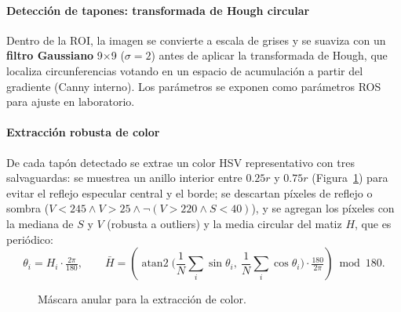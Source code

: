 \documentclass[12pt,a4paper]{article}
\begin{document}
\paragraph{Detección de tapones: transformada de Hough circular}

Dentro de la ROI, la imagen se convierte a escala de grises y se suaviza con un
\textbf{filtro Gaussiano} 9$\times$9 ($\sigma=2$) antes de aplicar
la transformada de Hough, que localiza circunferencias
votando en un espacio de acumulación a partir del gradiente
(Canny interno). Los parámetros se exponen como parámetros
ROS para ajuste en laboratorio.

\paragraph{Extracción robusta de color}
\label{sec:color-robusto}

De cada tapón detectado se extrae un color HSV representativo
con tres salvaguardas: se muestrea un anillo
interior entre $0.25r$ y $0.75r$ (Figura~\ref{fig:anillo}) para evitar el
reflejo especular central y el borde; se descartan píxeles de reflejo o sombra
($V<245 \wedge V>25 \wedge \neg(V>220 \wedge S<40)$), y se agregan los píxeles con
la mediana de $S$ y $V$ (robusta a outliers) y la media
circular del matiz $H$, que es periódico:
\begin{equation}
\theta_i = H_i\cdot\tfrac{2\pi}{180},\qquad
\bar{H} = \left(\operatorname{atan2}\!\Big(\textstyle\frac1N\sum_i\sin\theta_i,\ \frac1N\sum_i\cos\theta_i\Big)\cdot\tfrac{180}{2\pi}\right)\bmod 180.
\label{eq:media-circular}
\end{equation}

\begin{figure}[H]
\centering
{}
\caption{Máscara anular para la extracción de color.}
\label{fig:anillo}
\end{figure}
\end{document}
